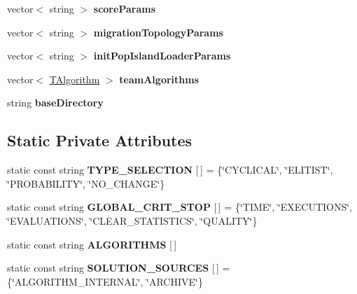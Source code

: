 \begin{DoxyCompactItemize}
\item 
\mbox{\label{classConfiguration_a9b484b53062a3319b1e0e6a511ba23bc}} 
vector$<$ string $>$ {\bfseries score\+Params}
\item 
\mbox{\label{classConfiguration_a0c8750b7b7d924f5a3ccbbd3eb1abc29}} 
vector$<$ string $>$ {\bfseries migration\+Topology\+Params}
\item 
\mbox{\label{classConfiguration_a9c54687aacc678df09936e85374e7913}} 
vector$<$ string $>$ {\bfseries init\+Pop\+Island\+Loader\+Params}
\item 
\mbox{\label{classConfiguration_aa414f3bdc7aa513fe1debd8f7f2e8122}} 
vector$<$ \mbox{\hyperlink{structTAlgorithm}{T\+Algorithm}} $>$ {\bfseries team\+Algorithms}
\item 
\mbox{\label{classConfiguration_aae3262a834dd14d6b44798c4929124f3}} 
string {\bfseries base\+Directory}
\end{DoxyCompactItemize}
\subsection*{Static Private Attributes}
\begin{DoxyCompactItemize}
\item 
\mbox{\label{classConfiguration_a757a66fcb9534baa627fa8716ce14150}} 
static const string {\bfseries T\+Y\+P\+E\+\_\+\+S\+E\+L\+E\+C\+T\+I\+ON} \mbox{[}$\,$\mbox{]} = \{\char`\"{}C\+Y\+C\+L\+I\+C\+AL\char`\"{}, \char`\"{}E\+L\+I\+T\+I\+ST\char`\"{}, \char`\"{}P\+R\+O\+B\+A\+B\+I\+L\+I\+TY\char`\"{}, \char`\"{}N\+O\+\_\+\+C\+H\+A\+N\+GE\char`\"{}\}
\item 
\mbox{\label{classConfiguration_aef5e638d8890de25230e82e75064da6a}} 
static const string {\bfseries G\+L\+O\+B\+A\+L\+\_\+\+C\+R\+I\+T\+\_\+\+S\+T\+OP} \mbox{[}$\,$\mbox{]} = \{\char`\"{}T\+I\+ME\char`\"{}, \char`\"{}E\+X\+E\+C\+U\+T\+I\+O\+NS\char`\"{}, \char`\"{}E\+V\+A\+L\+U\+A\+T\+I\+O\+NS\char`\"{}, \char`\"{}C\+L\+E\+A\+R\+\_\+\+S\+T\+A\+T\+I\+S\+T\+I\+CS\char`\"{}, \char`\"{}Q\+U\+A\+L\+I\+TY\char`\"{}\}
\item 
\mbox{\label{classConfiguration_a9b4480e51814426c7503b7b67359e77e}} 
static const string {\bfseries A\+L\+G\+O\+R\+I\+T\+H\+MS} \mbox{[}$\,$\mbox{]}
\item 
\mbox{\label{classConfiguration_a295ef134842d19ccf3fb1d605ec974fc}} 
static const string {\bfseries S\+O\+L\+U\+T\+I\+O\+N\+\_\+\+S\+O\+U\+R\+C\+ES} \mbox{[}$\,$\mbox{]} = \{\char`\"{}A\+L\+G\+O\+R\+I\+T\+H\+M\+\_\+\+I\+N\+T\+E\+R\+N\+AL\char`\"{}, \char`\"{}A\+R\+C\+H\+I\+VE\char`\"{}\}
\end{DoxyCompactItemize}


